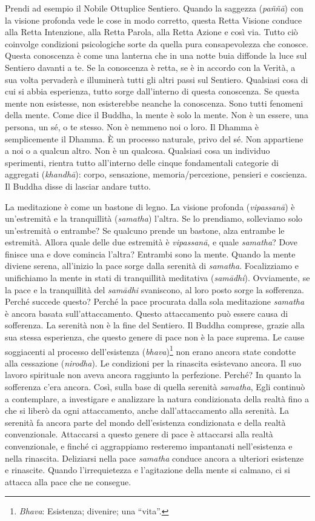 Prendi ad esempio il Nobile Ottuplice Sentiero. Quando la saggezza
(\emph{paññā}) con la visione profonda vede le cose in modo corretto,
questa Retta Visione conduce alla Retta Intenzione, alla Retta Parola,
alla Retta Azione e così via. Tutto ciò coinvolge condizioni
psicologiche sorte da quella pura consapevolezza che conosce. Questa
conoscenza è come una lanterna che in una notte buia diffonde la luce
sul Sentiero davanti a te. Se la conoscenza è retta, se è in accordo con
la Verità, a sua volta pervaderà e illuminerà tutti gli altri passi sul
Sentiero. Qualsiasi cosa di cui si abbia esperienza, tutto sorge
dall'interno di questa conoscenza. Se questa mente non esistesse, non
esisterebbe neanche la conoscenza. Sono tutti fenomeni della mente. Come
dice il Buddha, la mente è solo la mente. Non è un essere, una persona,
un sé, o te stesso. Non è nemmeno noi o loro. Il Dhamma è semplicemente
il Dhamma. È un processo naturale, privo del sé. Non appartiene a noi o
a qualcun altro. Non è un qualcosa. Qualsiasi cosa un individuo
sperimenti, rientra tutto all'interno delle cinque fondamentali
categorie di aggregati (\emph{khandhā}): corpo, sensazione,
memoria/percezione, pensieri e coscienza. Il Buddha disse di lasciar
andare tutto.

La meditazione è come un bastone di legno. La visione profonda
(\emph{vipassanā}) è un'estremità e la tranquillità (\emph{samatha})
l'altra. Se lo prendiamo, solleviamo solo un'estremità o entrambe? Se
qualcuno prende un bastone, alza entrambe le estremità. Allora quale
delle due estremità è \emph{vipassanā}, e quale \emph{samatha}? Dove
finisce una e dove comincia l'altra? Entrambi sono la mente. Quando la
mente diviene serena, all'inizio la pace sorge dalla serenità di
\emph{samatha}. Focalizziamo e unifichiamo la mente in stati di
tranquillità meditativa (\emph{samādhi}). Ovviamente, se la pace e la
tranquillità del \emph{samādhi} svaniscono, al loro posto sorge la
sofferenza. Perché succede questo? Perché la pace procurata dalla sola
meditazione \emph{samatha} è ancora basata sull'attaccamento. Questo
attaccamento può essere causa di sofferenza. La serenità non è la fine
del Sentiero. Il Buddha comprese, grazie alla sua stessa esperienza, che
questo genere di pace non è la pace suprema. Le cause soggiacenti al
processo dell'esistenza (\emph{bhava})\footnote{\emph{Bhava}: Esistenza;
  divenire; una ``vita''.} non erano ancora state condotte alla
cessazione (\emph{nirodha}). Le condizioni per la rinascita esistevano
ancora. Il suo lavoro spirituale non aveva ancora raggiunto la
perfezione. Perché? In quanto la sofferenza c'era ancora. Così, sulla
base di quella serenità \emph{samatha}, Egli continuò a contemplare, a
investigare e analizzare la natura condizionata della realtà fino a che
si liberò da ogni attaccamento, anche dall'attaccamento alla serenità.
La serenità fa ancora parte del mondo dell'esistenza condizionata e
della realtà convenzionale. Attaccarsi a questo genere di pace è
attaccarsi alla realtà convenzionale, e finché ci aggrappiamo resteremo
impantanati nell'esistenza e nella rinascita. Deliziarsi nella pace
\emph{samatha} conduce ancora a ulteriori esistenze e rinascite. Quando
l'irrequietezza e l'agitazione della mente si calmano, ci si attacca
alla pace che ne consegue.

